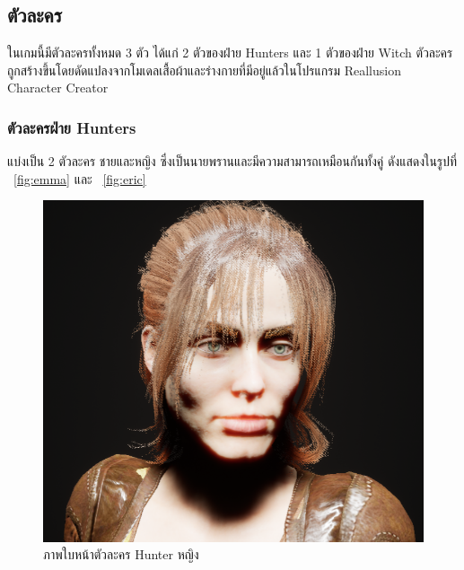 \subsection{ตัวละคร}

ในเกมนี้มีตัวละครทั้งหมด 3 ตัว ได้แก่ 2 ตัวของฝ่าย Hunters และ 1 ตัวของฝ่าย Witch ตัวละครถูกสร้างขึ้นโดยดัดแปลงจากโมเดลเสื้อผ้าและร่างกายที่มีอยู่แล้วในโปรแกรม Reallusion Character Creator

\subsubsection{ตัวละครฝ่าย Hunters}

แบ่งเป็น 2 ตัวละคร ชายและหญิง ซึ่งเป็นนายพรานและมีความสามารถเหมือนกันทั้งคู่ ดังแสดงในรูปที่ ~\ref{fig:emma} และ ~\ref{fig:eric}

\begin{figure}
  \centering
  \begin{subcaptionblock}{.4\textwidth}
    \centering
    \includegraphics[width=.8\linewidth]{./img/characters/emma_face.png}
    \caption{ภาพใบหน้าตัวละคร Hunter หญิง}\label{ภาพใบหน้าตัวละคร Hunter หญิง}
  \end{subcaptionblock}%
  \begin{subcaptionblock}{.4\textwidth}
    \centering

\end{subcaptionblock}
\end{figure}
